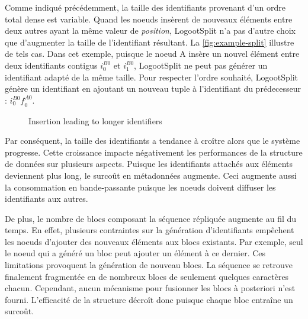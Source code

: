 \documentclass[12pt]{thesul}
\newcommand{\trm}[1]{\mathit{#1}}
\newcommand{\id}[3]{$\trm{#1}^{\trm{#2}}_{\trm{#3}}$}
\newcommand{\widthletter}{2em}
\begin{document}
Comme indiqué précédemment, la taille des identifiants provenant d'un ordre total dense est variable.
Quand les noeuds insèrent de nouveaux éléments entre deux autres ayant la même valeur de \emph{position}, LogootSplit n'a pas d'autre choix que d'augmenter la taille de l'identifiant résultant.
La \autoref{fig:example-split} illustre de tels cas.
Dans cet exemple, puisque le noeud A insère un nouvel élément entre deux identifiants contigus \id{i}{B0}{0} et \id{i}{B0}{1}, LogootSplit ne peut pas générer un identifiant adapté de la même taille.
Pour respecter l'ordre souhaité, LogootSplit génère un identifiant en ajoutant un nouveau tuple à l'identifiant du prédecesseur : \id{i}{B0}{0}\id{f}{A0}{0}.

\begin{figure}[!ht]
  \centering
  \caption{Insertion leading to longer identifiers}
  \label{fig:example-split}
\end{figure}

Par conséquent, la taille des identifiants a tendance à croître alors que le système progresse.
Cette croissance impacte négativement les performances de la structure de données sur plusieurs aspects.
Puisque les identifiants attachés aux éléments deviennent plus long, le surcoût en métadonnées augmente.
Ceci augmente aussi la consommation en bande-passante puisque les noeuds doivent diffuser les identifiants aux autres.


De plus, le nombre de blocs composant la séquence répliquée augmente au fil du temps.
En effet, plusieurs contraintes sur la génération d'identifiants empêchent les noeuds d'ajouter des nouveaux éléments aux blocs existants.
Par exemple, seul le noeud qui a généré un bloc peut ajouter un élément à ce dernier.
Ces limitations provoquent la génération de nouveau blocs.
La séquence se retrouve finalement fragmentée en de nombreux blocs de seulement quelques caractères chacun.
Cependant, aucun mécanisme pour fusionner les blocs à posteriori n'est fourni.
L'efficacité de la structure décroît donc puisque chaque bloc entraîne un surcoût.
\end{document}
